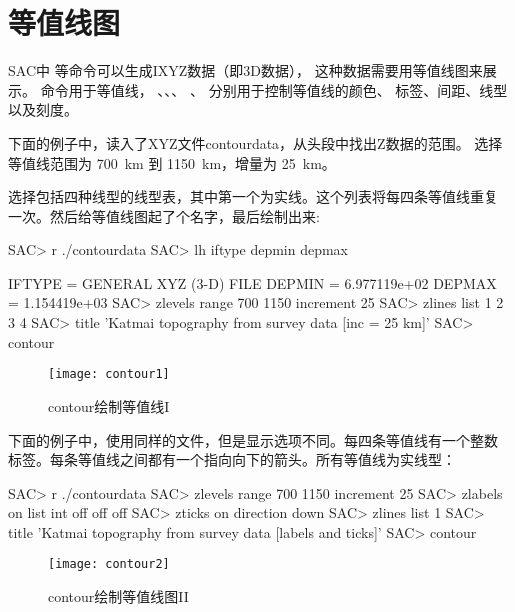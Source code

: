 \section{等值线图}
\label{sec:contour}
SAC中  等命令可以生成IXYZ数据（即3D数据），
这种数据需要用等值线图来展示。 命令用于等值线，
、、、
、 分别用于控制等值线的颜色、
标签、间距、线型以及刻度。

下面的例子中，读入了XYZ文件contourdata，从头段中找出Z数据的范围。
选择等值线范围为 \SI{700}{\km} 到 \SI{1150}{\km}，增量为 \SI{25}{\km}。

选择包括四种线型的线型表，其中第一个为实线。这个列表将每四条等值线重复
一次。然后给等值线图起了个名字，最后绘制出来:
\begin{SACCode}
SAC> r ./contourdata
SAC> lh iftype depmin depmax

       IFTYPE = GENERAL XYZ (3-D) FILE
       DEPMIN = 6.977119e+02
       DEPMAX = 1.154419e+03
SAC> zlevels range 700 1150 increment 25
SAC> zlines list 1 2 3 4
SAC> title 'Katmai topography from survey data [inc = 25 km]'
SAC> contour
\end{SACCode}

\begin{figure}[H]
\centering
\texttt{[image: contour1]}
\caption{contour绘制等值线I}
\end{figure}

下面的例子中，使用同样的文件，但是显示选项不同。每四条等值线有一个整数
标签。每条等值线之间都有一个指向向下的箭头。所有等值线为实线型：
\begin{SACCode}
SAC> r ./contourdata
SAC> zlevels range 700 1150 increment 25
SAC> zlabels on list int off off off
SAC> zticks on direction down
SAC> zlines list 1
SAC> title 'Katmai topography from survey data [labels and ticks]'
SAC> contour
\end{SACCode}

\begin{figure}[H]
\centering
\texttt{[image: contour2]}
\caption{contour绘制等值线图II}
\end{figure}
